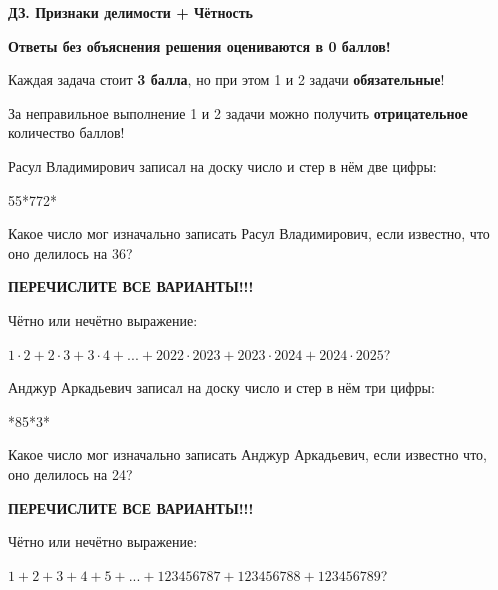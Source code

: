 \centerline{\bf \Huge ДЗ. Признаки делимости + Чётность}
\centerline{\bf \Huge }

\begin{flushright}
        \scriptsize{\textbf{Ответы без объяснения решения оцениваются в 0 баллов!}}
\end{flushright}

Каждая задача стоит \textbf{3 балла}, но при этом 1 и 2 задачи \textbf{обязательные}! 

За неправильное выполнение 1 и 2 задачи можно получить \textbf{отрицательное} количество баллов!

 Расул Владимирович записал на доску число и стер в нём две цифры: 

55*772*

Какое число мог изначально записать Расул Владимирович, если известно, что оно делилось на 36?

\textbf{ПЕРЕЧИСЛИТЕ ВСЕ ВАРИАНТЫ!!!}

  Чётно или нечётно выражение:

$1\cdot2+2\cdot3+3\cdot4+...+2022\cdot2023+2023\cdot2024+2024\cdot2025$?


 Анджур Аркадьевич записал на доску число и стер в нём три цифры:

*85*3*

Какое число мог изначально записать Анджур Аркадьевич, если известно что, оно делилось на 24? 

\textbf{ПЕРЕЧИСЛИТЕ ВСЕ ВАРИАНТЫ!!!}

  Чётно или нечётно выражение:

$1+2+3+4+5+...+123456787+ 123456788 + 123456789$?